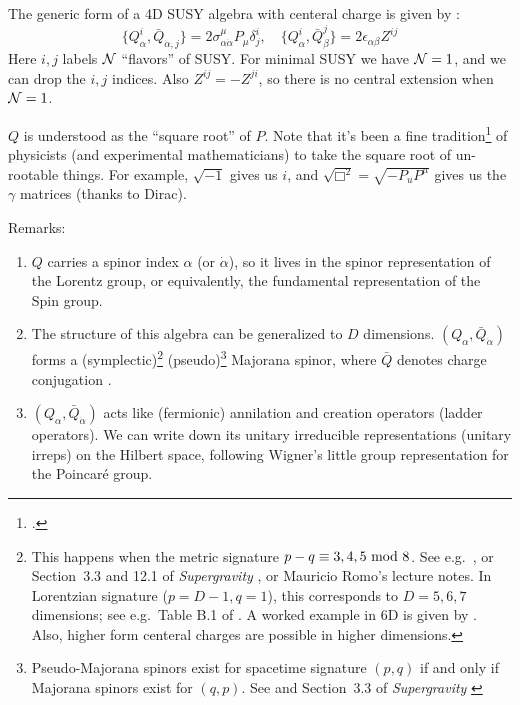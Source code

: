 \documentclass[a4paper
	,10pt
]{article}
\begin{document}
	The generic form of a 4D SUSY algebra with centeral charge is given by \cite{Wess:1992cp}:
	\begin{equation}
		\{ Q^i_\alpha, \bar{Q}_{\dot{\alpha},j} \}
		= 2\sigma^\mu_{\alpha\dot{\alpha}} P_\mu
			\delta^i_j,
	\quad
		\{ Q^i_\alpha, \bar{Q}^j_{\beta} \}
		= 2\epsilon_{\alpha\beta} Z^{ij}
	\end{equation}
	Here $i,j$ labels $\mathcal{N}$ ``flavors'' of SUSY. For minimal SUSY we have $\mathcal{N} = 1$, and we can drop the $i,j$ indices. Also $Z^{ij} = -Z^{ji}$, so there is no central extension when $\mathcal{N} = 1$. 
	
	$Q$ is understood as the ``square root'' of $P$. 
	Note that it's been a fine tradition\footnote{
		.
	} of physicists (and experimental mathematicians) to take the square root of un-rootable things. For example, $\sqrt{-1}$ gives us $i$, and $\sqrt{\Box^2} = \sqrt{-P_u P^\mu}$ gives us the $\gamma$ matrices (thanks to Dirac). 
	
	Remarks:
	\begin{enumerate}
	\item $Q$ carries a spinor index $\alpha$ (or $\dot{\alpha}$), so it lives in the spinor representation of the Lorentz group, or equivalently, the fundamental representation of the Spin group. 
	
	\item The structure of this algebra can be generalized to $D$ dimensions. $(Q_\alpha, \bar{Q}_{\dot{\alpha}})$ forms a \mbox{(symplectic)}\footnote{
		This happens when the metric signature $p - q \equiv 3,4,5\,\operatorname{mod}\,8$. See e.g.~\textcite{figueroa2015majorana}, or Section~3.3 and 12.1 of \textit{Supergravity} \cite{Freedman:2012zz}, or Mauricio Romo's lecture notes. In Lorentzian signature ($p = D-1, q = 1$), this corresponds to $D = 5,6,7$ dimensions; see e.g.~Table B.1 of \textcite{Polchinski:1998rq}. A worked example in 6D is given by \cite{Gustavsson:2001uw}. Also, higher form centeral charges are possible in higher dimensions. 
	} (pseudo)\footnote{
		Pseudo-Majorana spinors exist for spacetime signature $(p,q)$ if and only if Majorana spinors exist for $(q,p)$. See \textcite{figueroa2015majorana} and Section~3.3 of \textit{Supergravity} \cite{Freedman:2012zz}
	} Majorana spinor, where $\bar{Q}$ denotes charge conjugation \cite{Freedman:2012zz}. 
	
	\item $(Q_\alpha, \bar{Q}_{\dot{\alpha}})$ acts like (fermionic) annilation and creation operators (ladder operators). We can write down its unitary irreducible representations (unitary irreps) on the Hilbert space, following Wigner's little group representation for the Poincar\'e group. 
	\end{enumerate}
\end{document}

